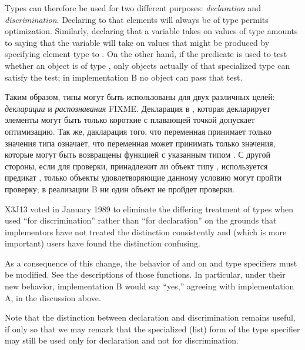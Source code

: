 \begin{obsolete}
Types can therefore be used for two different purposes:
\textit{declaration} and \textit{discrimination}.  Declaring to 
that elements will always be of type  permits
optimization.  Similarly, declaring that a variable takes on
values of type  amounts to saying that
the variable will take on values that might be produced by specifying
element type  to .
On the other hand, if the predicate  is used to test
whether an object is of type ,
only objects actually of that specialized type can satisfy the test;
in implementation B no object can pass that test.

Таким образом, типы могут быть использованы для двух различных целей:
\textit{декларации} и \textit{распознавания} FIXME. Декларация в
, которая декларирует
элементы могут быть только короткие с плавающей точкой допускает
оптимизацию. Так же, дакларация того, что переменная принимает только значения
типа  означает, что переменная может принимать только
значения, которые могут быть возвращены функцией  с указанным
типом . С другой стороны, если для проверки, принадлежит ли
объект типу , используется предикат , только
объекты удовлетворяющие данному условию могут пройти проверку; в реализации B ни
один объект не пройдет проверки. 
\end{obsolete}

\begin{new}
X3J13 voted in January 1989
to eliminate the differing treatment of types
when used ``for discrimination'' rather than ``for declaration'' on the grounds
that implementors have not treated the distinction consistently
and (which is more important) users have found the distinction confusing.

As a consequence of this change, the behavior of  and 
on  and  type specifiers must be modified.
See the descriptions of those functions.  In particular, under their new
behavior, implementation B would say ``yes,'' agreeing with implementation A,
in the discussion above.

Note that the distinction between declaration and discrimination remains
useful, if only so that we may remark that the specialized (list)
form of the
 type specifier may still be used only for declaration and
not for discrimination.
\end{new}

